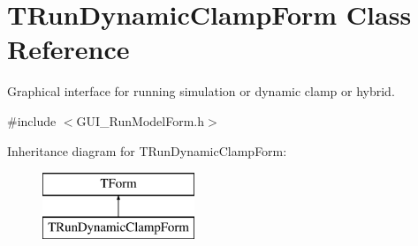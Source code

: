 \hypertarget{class_t_run_dynamic_clamp_form}{\section{T\+Run\+Dynamic\+Clamp\+Form Class Reference}
\label{class_t_run_dynamic_clamp_form}
}


Graphical interface for running simulation or dynamic clamp or hybrid.  




{\ttfamily \#include $<$G\+U\+I\+\_\+\+Run\+Model\+Form.\+h$>$}

Inheritance diagram for T\+Run\+Dynamic\+Clamp\+Form\+:\begin{figure}[H]
\begin{center}
\leavevmode
\includegraphics[height=2.000000cm]{class_t_run_dynamic_clamp_form}
\end{center}
\end{figure}

